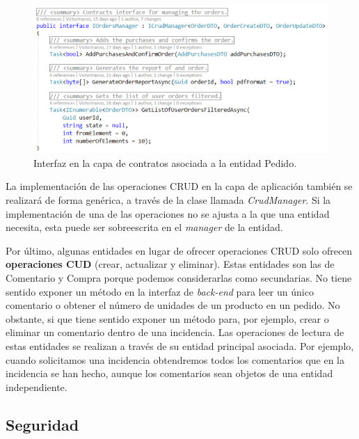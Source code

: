 \documentclass[11pt,spanish,listoffigures]{tfgetsinf}
\begin{document}
\begin{figure}[h]
\centering
\includegraphics[scale=0.8]{IOrdersManager}
\caption{Interfaz en la capa de contratos asociada a la entidad Pedido.}
\label{fig:IOrdersManager}
\end{figure}

La implementación de las operaciones CRUD en la capa de aplicación también se realizará de forma genérica, a través de la clase llamada \textit{CrudManager}. Si la implementación de una de las operaciones no se ajusta a la que una entidad necesita, esta puede ser sobreescrita en el \textit{manager} de la entidad.

Por último, algunas entidades en lugar de ofrecer operaciones CRUD solo ofrecen \textbf{operaciones CUD} (crear, actualizar y eliminar). Estas entidades son las de Comentario y Compra porque podemos considerarlas como secundarias. No tiene sentido exponer un método en la interfaz de \textit{back-end} para leer un único comentario o obtener el número de unidades de un producto en un pedido. No obstante, si que tiene sentido exponer un método para, por ejemplo, crear o eliminar un comentario dentro de una incidencia. Las operaciones de lectura de estas entidades se realizan a través de su entidad principal asociada. Por ejemplo, cuando solicitamos una incidencia obtendremos todos los comentarios que en la incidencia se han hecho, aunque los comentarios sean objetos de una entidad independiente.

\subsection{Seguridad}
\end{document}
